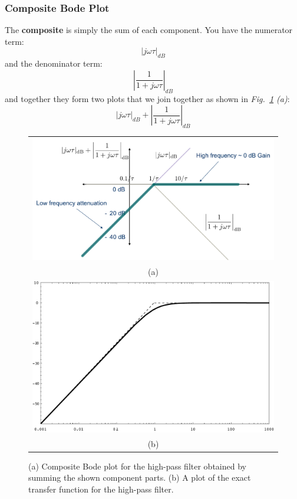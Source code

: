 \subsubsection{Composite Bode Plot}
The \textbf{composite} is simply the sum of each component.  You have the numerator term:
    \begin{equation}
        {\left| {j\omega \tau } \right|_{dB}}
    \end{equation}
and the denominator term:
    \begin{equation}
        {\left| {\frac{1}{{1 + j\omega \tau }}} \right|_{dB}}
    \end{equation}
and together they form two plots that we join together as shown in \emph{Fig.~\ref{fig:bode} (a)}:
    \begin{equation}
        {\left| {j\omega \tau } \right|_{dB}} + {\left| {\frac{1}{{1 + j\omega \tau }}} \right|_{dB}}
    \end{equation}
\begin{figure}[tb]
\centering
\begin{tabular}{c}
\includegraphics[width=.75\columnwidth]{mod1_3_11_bode3}\\
(a)\\
\includegraphics[angle=-0.0,width=.75\columnwidth]{mag_hpf}\\
(b)\\
\end{tabular}
\caption{(a) Composite Bode plot for the high-pass filter obtained by summing the shown component parts.  (b) A plot of the exact transfer function for the high-pass filter.}
\label{fig:bode}
\end{figure}

